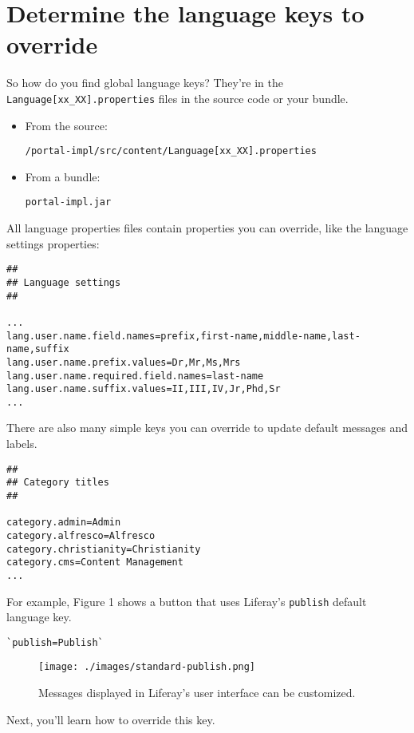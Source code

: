\section{Determine the language keys to
override}\label{determine-the-language-keys-to-override}

So how do you find global language keys? They're in the
\texttt{Language{[}xx\_XX{]}.properties} files in the source code or
your bundle.

\begin{itemize}
\item
  From the source:

  \texttt{/portal-impl/src/content/Language{[}xx\_XX{]}.properties}
\item
  From a bundle:

  \texttt{portal-impl.jar}
\end{itemize}

All language properties files contain properties you can override, like
the language settings properties:

\begin{verbatim}
##
## Language settings
##

...
lang.user.name.field.names=prefix,first-name,middle-name,last-name,suffix
lang.user.name.prefix.values=Dr,Mr,Ms,Mrs
lang.user.name.required.field.names=last-name
lang.user.name.suffix.values=II,III,IV,Jr,Phd,Sr
...
\end{verbatim}

There are also many simple keys you can override to update default
messages and labels.

\begin{verbatim}
##
## Category titles
##

category.admin=Admin
category.alfresco=Alfresco
category.christianity=Christianity
category.cms=Content Management
...
\end{verbatim}

For example, Figure 1 shows a button that uses Liferay's
\texttt{publish} default language key.

\begin{verbatim}
`publish=Publish`
\end{verbatim}

\begin{figure}
\centering
\texttt{[image: ./images/standard-publish.png]}
\caption{Messages displayed in Liferay's user interface can be
customized.}
\end{figure}

Next, you'll learn how to override this key.

